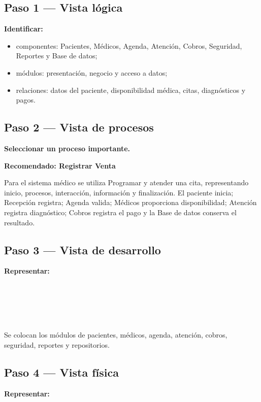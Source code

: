 \subsection*{Paso 1 — Vista lógica}
\textbf{Identificar:}
\begin{itemize}
    \item componentes: Pacientes, Médicos, Agenda, Atención, Cobros, Seguridad, Reportes y Base de datos;
    \item módulos: presentación, negocio y acceso a datos;
    \item relaciones: datos del paciente, disponibilidad médica, citas, diagnósticos y pagos.
\end{itemize}

\subsection*{Paso 2 — Vista de procesos}
\textbf{Seleccionar un proceso importante.}

\textbf{Recomendado: Registrar Venta}

Para el sistema médico se utiliza Programar y atender una cita, representando inicio, procesos, interacción, información y finalización. El paciente inicia; Recepción registra; Agenda valida; Médicos proporciona disponibilidad; Atención registra diagnóstico; Cobros registra el pago y la Base de datos conserva el resultado.

\subsection*{Paso 3 — Vista de desarrollo}
\textbf{Representar:}

\begin{center}
\\[3pt]
\flechaflujo\\[3pt]
\\[3pt]
\flechaflujo\\[3pt]
\end{center}

Se colocan los módulos de pacientes, médicos, agenda, atención, cobros, seguridad, reportes y repositorios.

\subsection*{Paso 4 — Vista física}
\textbf{Representar:}

\begin{center}
\\[3pt]
\flechaflujo\\[3pt]
\\[3pt]
\flechaflujo\\[3pt]
\\[3pt]
\flechaflujo\\[3pt]
\end{center}

